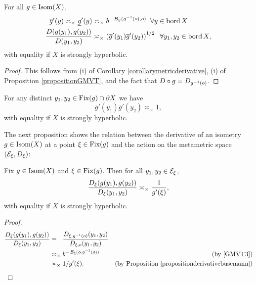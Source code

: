 \begin{proposition}
\label{propositionderivativebusemann}
For all $g\in\operatorname{Isom}(X)$,
\begin{align*}
\overline g'(y) \asymp_\times \underline g'(y) &\asymp_\times b^{-\operatorname{\mathcal B}_y(g^{-1}(o),o)} \;\;\forall y\in\operatorname{bord} X\\
\frac{D(g(y_1),g(y_2))}{D(y_1,y_2)} &\asymp_\times \left(\overline g'(y_1) \overline g'(y_2)\right)^{1/2} \;\;\forall y_1,y_2\in\operatorname{bord} X,
\end{align*}
with equality if $X$ is strongly hyperbolic.
\end{proposition}
\begin{proof}
This follows from (i) of Corollary \ref{corollarymetricderivative}, (i) of Proposition \ref{propositionGMVT}, and the fact that $D\circ g = D_{g^{-1}(o)}$.
\end{proof}

\begin{corollary}
\label{corollaryproductoneorig}
For any distinct $y_1,y_2\in\operatorname{Fix}(g)\cap\partial X$ we have
\[
\overline g'(y_1) \overline g'(y_2) \asymp_\times 1,
\]
with equality if $X$ is strongly hyperbolic.
\end{corollary}

The next proposition shows the relation between the derivative of an isometry $g\in\operatorname{Isom}(X)$ at a point $\xi\in\operatorname{Fix}(g)$ and the action on the metametric space $(\mathcal E_\xi,D_\xi)$:



\begin{proposition}
\label{propositioneuclideansimilarity}
Fix $g\in\operatorname{Isom}(X)$ and $\xi\in\operatorname{Fix}(g)$. Then for all $y_1,y_2\in\mathcal E_\xi$,
\[
\frac{D_\xi(g(y_1), g(y_2))}{D_\xi(y_1,y_2)} \asymp_\times \frac{1}{g'(\xi)},
\]
with equality if $X$ is strongly hyperbolic.
\end{proposition}
\begin{proof}
\begin{align*}
\frac{\Dist_\xi(g(y_1), g(y_2))}{\Dist_\xi(y_1,y_2)} &=_\pt \frac{\Dist_{\xi,g^{-1}(\zero)}(y_1, y_2)}{\Dist_{\xi,\zero}(y_1,y_2)} \\
&\asymp_\times b^{-\busemann_\xi(\zero,g^{-1}(\zero))} \by{\eqref{GMVT3}} \\
&\asymp_\times 1/g'(\xi). \by{Proposition \ref{propositionderivativebusemann}}
\end{align*}
\end{proof}

